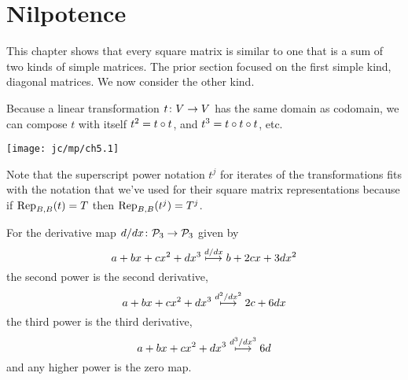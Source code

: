 \section{Nilpotence}
This chapter shows that every square matrix is similar to one
that is a sum of two kinds of simple matrices.
The prior section
focused on the first simple kind, diagonal matrices.
We now consider the other kind.










Because a linear transformation $\map{t}{V}{V}$ has the same domain as
codomain, we can
compose $t$ with itself 
\( t^2=\composed{t}{t} \), 
and \( t^3=\composed{t}{\composed{t}{t}} \), 
etc. %
\begin{center}
  \texttt{[image: jc/mp/ch5.1]}
\end{center}
Note that the superscript
power notation $t^j$ for iterates of the transformations 
fits with 
the notation that we've used for their square matrix representations
because if $\rep{t}{B,B}=T$ then \( \rep{t^j}{B,B}=T^j \).


\begin{example} \label{ex:DerivIter}
For the derivative map \( \map{d/dx}{\polyspace_3}{\polyspace_3} \)
given by 
\begin{equation*}
  a+bx+cx^2+dx^3\xmapsunder{d/dx} b+2cx+3dx^2
\end{equation*}
the second power is the second derivative,
\begin{equation*}
  a+bx+cx^2+dx^3\xmapsunder{d^2/dx^2} 2c+6dx 
\end{equation*}
the third power is the third derivative,
\begin{equation*}
  a+bx+cx^2+dx^3\xmapsunder{d^3/dx^3} 6d 
\end{equation*}
and any higher power is the zero map.
\end{example}

